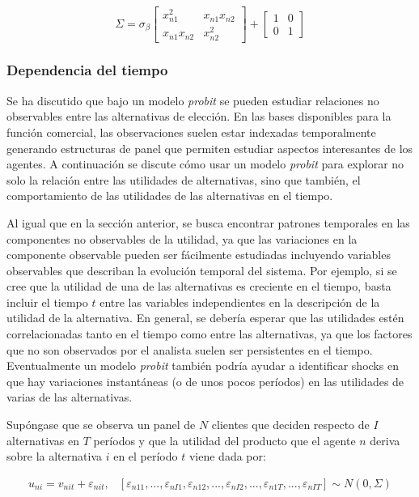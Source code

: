 \documentclass[
]{book}
\begin{document}
\[Σ= \sigma_\beta \begin{bmatrix}x^2_{n1} & x_{n1}x_{n2}\\
x_{n1}x_{n2} & x^2_{n2} \end{bmatrix} + \begin{bmatrix}1 & 0\\
0 & 1\end{bmatrix}\]

\hypertarget{dependencia-del-tiempo}{%
\subsubsection{Dependencia del tiempo}\label{dependencia-del-tiempo}}

Se ha discutido que bajo un modelo \emph{probit} se pueden estudiar relaciones no observables entre las alternativas de elección. En las bases disponibles para la función comercial, las observaciones suelen estar indexadas temporalmente generando estructuras de panel que permiten estudiar aspectos interesantes de los agentes. A continuación se discute cómo usar un modelo \emph{probit} para explorar no solo la relación entre las utilidades de alternativas, sino que también, el comportamiento de las utilidades de las alternativas en el tiempo.

Al igual que en la sección anterior, se busca encontrar patrones temporales en las componentes no observables de la utilidad, ya que las variaciones en la componente observable pueden ser fácilmente estudiadas incluyendo variables observables que describan la evolución temporal del sistema. Por ejemplo, si se cree que la utilidad de una de las alternativas es creciente en el tiempo, basta incluir el tiempo \(t\) entre las variables independientes en la descripción de la utilidad de la alternativa. En general, se debería esperar que las utilidades estén correlacionadas tanto en el tiempo como entre las alternativas, ya que los factores que no son observados por el analista suelen ser persistentes en el tiempo. Eventualmente un modelo \emph{probit} también podría ayudar a identificar shocks en que hay variaciones instantáneas (o de unos pocos períodos) en las utilidades de varias de las alternativas.

Supóngase que se observa un panel de \(N\) clientes que deciden respecto de \(I\) alternativas en \(T\) períodos y que la utilidad del producto que el agente \(n\) deriva sobre la alternativa \(i\) en el período \(t\) viene dada por:

\begin{equation} 
  \begin{array}{cc}
    u_{ni} = v_{nit} + \varepsilon_{nit},  & [\varepsilon_{n11},...,\varepsilon_{nI1},\varepsilon_{n12}, ..., \varepsilon_{nI2},...,\varepsilon_{n1T},...,\varepsilon_{nIT}] \sim N(0,Σ)
  \end{array}  
  \label{eq:cdeterministaequi}
\end{equation}
\end{document}
